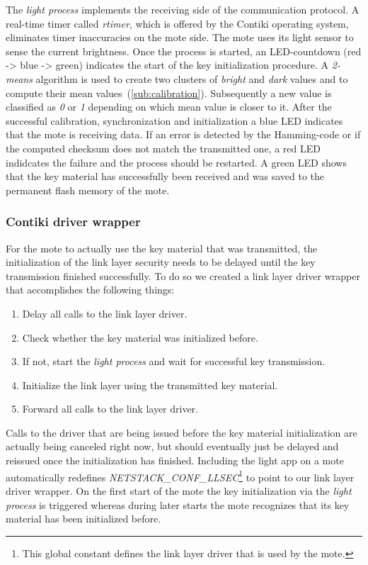 \documentclass{sig-alternate} %
\begin{document}
The \textit{light process} implements the receiving side of the communication protocol.
A real-time timer called \textit{rtimer}, which is offered by the Contiki operating system, eliminates timer inaccuracies on the mote side.
The mote uses its light sensor to sense the current brightness.
Once the process is started, an LED-countdown (red -> blue -> green) indicates the start of the key initialization procedure.
A \mbox{\textit{2-means}} algorithm is used to create two clusters of \textit{bright} and \textit{dark} values and to compute their mean values~(\ref{sub:calibration}).
Subsequently a new value is classified as \textit{0} or \textit{1} depending on which mean value is closer to it.
After the successful calibration, synchronization and initialization a blue LED indicates that the mote is receiving data.
If an error is detected by the Hamming-code or if the computed checksum does not match the transmitted one, a red LED indidcates the failure and the process should be restarted.
A green LED shows that the key material has successfully been received and was saved to the permanent flash memory of the mote.


\subsubsection{Contiki driver wrapper}
\label{ssub:contiki_driver_wrapper}

For the mote to actually use the key material that was transmitted, the initialization of the link layer security needs to be delayed until the key transmission finished successfully.
To do so we created a link layer driver wrapper that accomplishes the following things:

\begin{enumerate}
	\item Delay all calls to the link layer driver.
	\item Check whether the key material was initialized before.
	\item If not, start the \textit{light process} and wait for successful key transmission.
	\item Initialize the link layer using the transmitted key material.
	\item Forward all calls to the link layer driver.
\end{enumerate}

Calls to the driver that are being issued before the key material initialization are actually being canceled right now, but should eventually just be delayed and reissued once the initialization has finished.
Including the light app on a mote automatically redefines \textit{NETSTACK\_CONF\_LLSEC}\footnote{This global constant defines the link layer driver that is used by the mote.} to point to our link layer driver wrapper.
On the first start of the mote the key initialization via the \textit{light process} is triggered whereas during later starts the mote recognizes that its key material has been initialized before.
\end{document}
